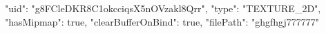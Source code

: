 {
    "uid": "g8FCleDKR8C1okcciqsX5nOVzakl8Qrr",
    "type": "TEXTURE_2D",
    "hasMipmap": true,
    "clearBufferOnBind": true,
    "filePath": "ghgfhgj777777"
}